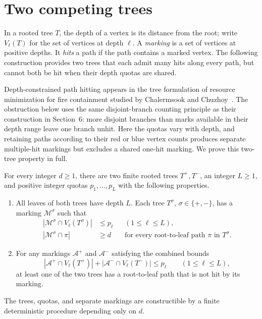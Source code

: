 \section{Two competing trees}
\label{sec:competing-trees}

In a rooted tree $T$, the depth of a vertex is its distance from the root;
write $V_\ell(T)$ for the set of vertices at depth $\ell$.  A
\emph{marking} is a set of vertices at positive depths.  It \emph{hits} a
path if the path contains a marked vertex.  The following construction
provides two trees that each admit many hits along every path, but cannot
both be hit when their depth quotas are shared.

Depth-constrained path hitting appears in the tree formulation of resource
minimization for fire containment studied by Chalermsook and
Chuzhoy~\cite[Section~2]{ChalermsookChuzhoy2010}.
The obstruction below uses the same disjoint-branch counting principle as
their construction in Section~6: more disjoint branches than marks
available in their depth range leave one branch unhit.
Here the quotas vary with depth, and retaining paths according to their
red or blue vertex counts produces separate multiple-hit markings but
excludes a shared one-hit marking.
We prove this two-tree property in full.

\begin{lemma}\label{lem:competing-trees}
For every integer $d\ge1$, there are two finite rooted trees $T^+,T^-$,
an integer $L\ge1$, and positive integer quotas $p_1,\ldots,p_L$ with the
following properties.
\begin{enumerate}[beginpenalty=10000]
\item All leaves of both trees have depth $L$.  Each tree $T^\sigma$,
$\sigma\in\{+,-\}$, has a marking $\mathcal M^\sigma$ such that
\begin{equation}\label{eq:tree-separate-marking}
 \begin{aligned}
 |\mathcal M^\sigma\cap V_\ell(T^\sigma)|&\le p_\ell
 &&(1\le\ell\le L),\\
 |\mathcal M^\sigma\cap\pi|&\ge d
 &&\text{for every root-to-leaf path $\pi$ in $T^\sigma$}.
 \end{aligned}
\end{equation}
\item For any markings $\mathcal A^+$ and $\mathcal A^-$ satisfying the
combined bounds
\begin{equation}\label{eq:tree-combined-quota}
 |\mathcal A^+\cap V_\ell(T^+)|+
 |\mathcal A^-\cap V_\ell(T^-)|\le p_\ell
 \qquad(1\le\ell\le L),
\end{equation}
at least one of the two trees has a root-to-leaf path that is not hit by
its marking.
\end{enumerate}
The trees, quotas, and separate markings are constructible by a finite
deterministic procedure depending only on $d$.
\end{lemma}


